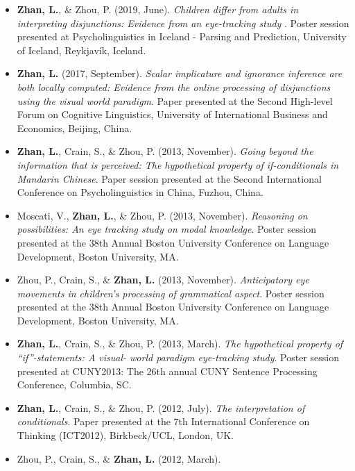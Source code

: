 \documentclass[12pt,]{article}
\begin{document}
\begin{itemize}
\item
  \textbf{Zhan, L.}, \& Zhou, P. (2019, June). \emph{Children differ
  from adults in interpreting disjunctions: Evidence from an
  eye-tracking study }. Poster session presented at Psycholinguistics in
  Iceland - Parsing and Prediction, University of Iceland, Reykjavík,
  Iceland. \href{https://publications.likan.info/Talks/PIPP_Poster.pdf}{
  \faFilePdf[regular] }
\item
  \textbf{Zhan, L.} (2017, September). \emph{Scalar implicature and
  ignorance inference are both locally computed: Evidence from the
  online processing of disjunctions using the visual world paradigm}.
  Paper presented at the Second High-level Forum on Cognitive
  Linguistics, University of International Business and Economics,
  Beijing, China.
  \href{https://publications.likan.info/Talks/ZhanL2017UIBE.pdf}{
  \faFilePdf[regular] }
\item
  \textbf{Zhan, L.}, Crain, S., \& Zhou, P. (2013, November).
  \emph{Going beyond the information that is perceived: The hypothetical
  property of if-conditionals in Mandarin Chinese}. Paper session
  presented at the Second International Conference on Psycholinguistics
  in China, Fuzhou, China.
\item
  Moscati, V., \textbf{Zhan, L.}, \& Zhou, P. (2013, November).
  \emph{Reasoning on possibilities: An eye tracking study on modal
  knowledge}. Poster session presented at the 38th Annual Boston
  University Conference on Language Development, Boston University, MA.
\item
  Zhou, P., Crain, S., \& \textbf{Zhan, L.} (2013, November).
  \emph{Anticipatory eye movements in children's processing of
  grammatical aspect}. Poster session presented at the 38th Annual
  Boston University Conference on Language Development, Boston
  University, MA.
\item
  \textbf{Zhan, L.}, Crain, S., \& Zhou, P. (2013, March). \emph{The
  hypothetical property of ``if''-statements: A visual- world paradigm
  eye-tracking study}. Poster session presented at CUNY2013: The 26th
  annual CUNY Sentence Processing Conference, Columbia, SC.
\item
  \textbf{Zhan, L.}, Crain, S., \& Zhou, P. (2012, July). \emph{The
  interpretation of conditionals}. Paper presented at the 7th
  International Conference on Thinking (ICT2012), Birkbeck/UCL, London,
  UK.
\item
  Zhou, P., Crain, S., \& \textbf{Zhan, L.} (2012, March).

\end{itemize}
\end{document}
